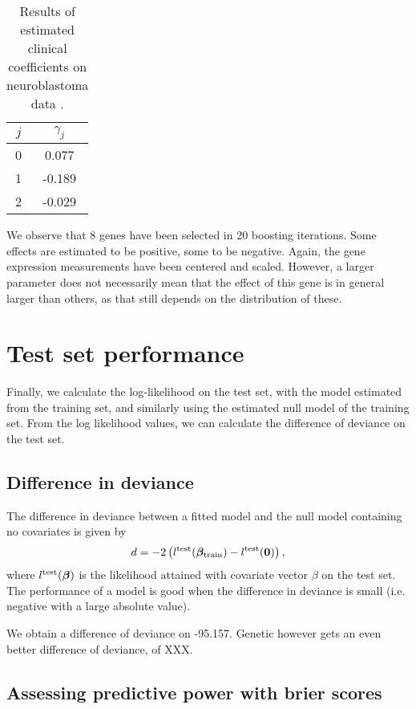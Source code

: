 \begin{table}
\caption{Results of estimated clinical coefficients on neuroblastoma data \citep{oberthuer-data}.}
\label{tab:oberthuer-gamma}
\centering
\begin{tabular}{cc}
\toprule
$j$ & $\gamma_j$\\
\hline
0 &  0.077  \\
1 &  -0.189 \\
2 &   -0.029 \\
\bottomrule
\end{tabular}
\end{table}

We observe that 8 genes have been selected in 20 boosting iterations.
Some effects are estimated to be positive, some to be negative.
Again, the gene expression measurements have been centered and scaled.
However, a larger parameter does not necessarily mean that the effect of this gene is in general larger than others, as that still depends on the distribution of these.



\section{Test set performance}
Finally, we calculate the log-likelihood on the test set, with the model estimated from the training set, and similarly using the estimated null model of the training set.
From the log likelihood values, we can calculate the difference of deviance on the test set.
\subsection{Difference in deviance}
The difference in deviance between a fitted model and the null model containing no covariates is given by
\begin{equation*}
    d=-2\left(l^{\text{test}}(\boldsymbol{\beta}_{\text{train}})-l^{\text{test}}(\bm{0})\right),
\end{equation*}
where $l^{\text{test}}(\boldsymbol{\beta})$ is the likelihood attained with covariate vector $\beta$ on the test set.
The performance of a model is good when the difference in deviance is small (i.e. negative with a large absolute value).

We obtain a difference of deviance on -95.157.
Genetic however gets an even better difference of deviance, of XXX.

\subsection{Assessing predictive power with brier scores}
